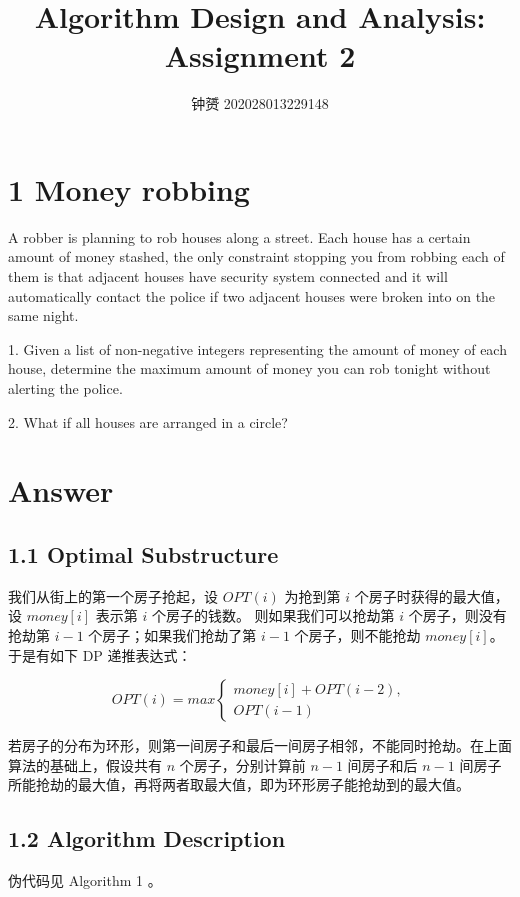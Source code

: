 \documentclass[UTF8]{ctexart}
\title{Algorithm Design and Analysis: Assignment 2}
\author{钟赟 202028013229148}
\begin{document}
\maketitle
        
\section*{1 Money robbing}
A robber is planning to rob houses along a street. Each house has a certain amount of money
stashed, the only constraint stopping you from robbing each of them is that adjacent houses have
security system connected and it will automatically contact the police if two adjacent houses were
broken into on the same night.

1. Given a list of non-negative integers representing the amount of money of each house, determine
the maximum amount of money you can rob tonight without alerting the police.

2. What if all houses are arranged in a circle?

\section*{Answer}
\subsection*{1.1 Optimal Substructure }
我们从街上的第一个房子抢起，设 $OPT(i)$ 为抢到第 $i$ 个房子时获得的最大值， 设 $money[i]$ 表示第 $i$ 个房子的钱数。
则如果我们可以抢劫第 $i$ 个房子，则没有抢劫第 $i-1$ 个房子；如果我们抢劫了第 $i-1$ 个房子，则不能抢劫 $money[i]$。于是有如下 DP 递推表达式：

$$OPT(i) = max \left\{
    \begin{aligned}
        money[i] + OPT(i-2),\\
        OPT(i-1)
    \end{aligned}
\right.
$$

若房子的分布为环形，则第一间房子和最后一间房子相邻，不能同时抢劫。在上面算法的基础上，假设共有 $n$ 个房子，分别计算前 $n-1$ 间房子和后 $n-1$ 间房子所能抢劫的最大值，再将两者取最大值，即为环形房子能抢劫到的最大值。
\subsection*{1.2 Algorithm Description}
伪代码见 Algorithm 1 。
\end{document}
